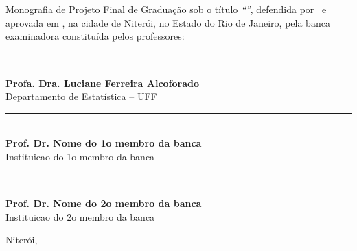 \documentclass[12pt,a4paper,header]{abnt}
\begin{document}
\begin{folhadeaprovacao}

\thispagestyle{logouff}

\hspace{.2\textwidth} %
\begin{minipage}{.7\textwidth}

\begin{flushright}

{\large \bf \ABNTautordata}\\[1cm]

{\large \bf \ABNTtitulodata}\\[1cm]

\end{flushright}

Monografia de Projeto Final de Graduação sob o título \textit{``\ABNTtitulodata''},
defendida por \ABNTautordata~e aprovada em \ABNTdatadata, na cidade de Niterói,
no Estado do Rio de Janeiro, pela banca examinadora constituída pelos
professores:

\begin{flushright}

\begin{espacosimples}






\vspace{2cm}
\noindent\rule{8cm}{0.4pt}\\
{\bf Profa. Dra. Luciane Ferreira Alcoforado}\\
Departamento de Estatística -- UFF\\


\vspace{2cm}
\noindent\rule{8cm}{0.4pt}\\
{\bf Prof. Dr. Nome do 1o membro da banca}\\
Instituicao do 1o membro da banca\\


\vspace{2cm}
\noindent\rule{8cm}{0.4pt}\\
{\bf Prof. Dr. Nome do 2o membro da banca}\\
Instituicao do 2o membro da banca\\

\end{espacosimples}

\end{flushright}

\vspace{2cm}
\hfill Niterói, \ABNTdatadata

\end{minipage}




\end{folhadeaprovacao}
\end{document}
